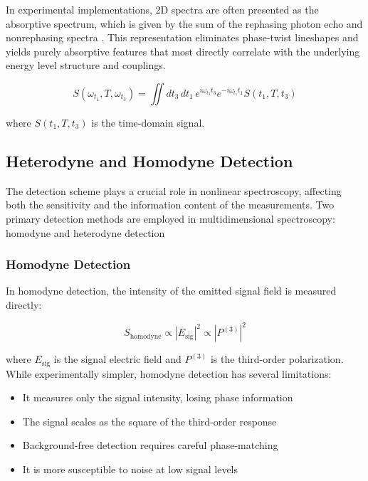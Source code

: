 \noindent In experimental implementations, 2D spectra are often presented as the absorptive spectrum, which is given by the sum of the rephasing photon echo and nonrephasing spectra \cite{cho2009twodimensionalopticalspectroscopy}. This representation eliminates phase-twist lineshapes and yields purely absorptive features that most directly correlate with the underlying energy level structure and couplings.

\begin{equation}
	S(\omega_{t_1}, T, \omega_{t_3}) = \iint dt_3\, dt_1\, e^{i\omega_{t_3} t_3} e^{-i\omega_{t_1} t_1} S(t_1, T, t_3)
	\label{eq:2des_signal}
\end{equation}

\noindent where $S(t_1, T, t_3)$ is the time-domain signal.

\subsection{Heterodyne and Homodyne Detection}
\label{subsec:heterodyne_homodyne}

\noindent The detection scheme plays a crucial role in nonlinear spectroscopy, affecting both the sensitivity and the information content of the measurements. Two primary detection methods are employed in multidimensional spectroscopy: homodyne and heterodyne detection %

\subsubsection{Homodyne Detection}
\label{subsubsec:homodyne}

\noindent In homodyne detection, the intensity of the emitted signal field is measured directly:

\begin{equation}
	S_{\text{homodyne}} \propto |E_{\text{sig}}|^2 \propto |P^{(3)}|^2
	\label{eq:homodyne}
\end{equation}

\noindent where $E_{\text{sig}}$ is the signal electric field and $P^{(3)}$ is the third-order polarization. While experimentally simpler, homodyne detection has several limitations:

\begin{itemize}
	\item It measures only the signal intensity, losing phase information
	\item The signal scales as the square of the third-order response
	\item Background-free detection requires careful phase-matching
	\item It is more susceptible to noise at low signal levels
\end{itemize}

